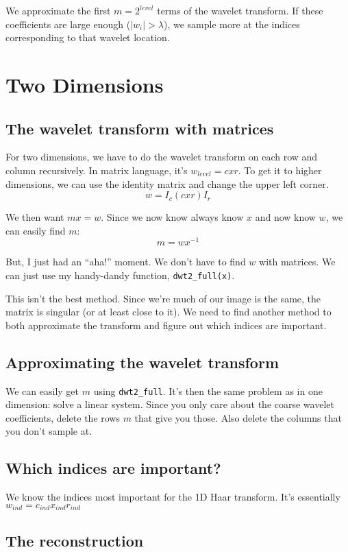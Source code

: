 \documentclass{article}
\begin{document}
        We approximate the first $m=2^{level}$ terms of the wavelet transform. If these coefficients are large enough ($|w_i|> \lambda$), we sample more at the indices corresponding to that wavelet location.


    \section{Two Dimensions}
        \subsection{The wavelet transform with matrices}
            For two dimensions, we have to do the wavelet transform on each row and column recursively. In matrix language, it's $w_{level} = c x r$. To get it to higher dimensions, we can use the identity matrix and change the upper left corner.
            $$w = I_c (c x r) I_r $$
            
            We then want $mx = w$. Since we now know always know $x$ and now know $w$, we can easily find $m$: $$ m = w x^{-1}$$

            But, I just had an ``aha!'' moment. We don't have to find $w$ with matrices. We can just use my handy-dandy function, \texttt{dwt2\_full(x)}.

            This isn't the best method. Since we're much of our image is the same, the matrix is singular (or at least close to it). We need to find another method to both approximate the transform and figure out which indices are important.
            
        \subsection{Approximating the wavelet transform}
            We can easily get $m$ using \texttt{dwt2\_full}. It's then the same problem as in one dimension: solve a linear system. Since you only care about the coarse wavelet coefficients, delete the rows $m$ that give you those. Also delete the columns that you don't sample at.


        \subsection{Which indices are important?}
        We know the indices most important for the 1D Haar transform. It's essentially $w_{ind} = c_{ind} x_{ind} r_{ind} $

        \subsection{The reconstruction}
\end{document}
